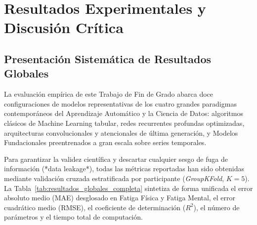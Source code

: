 
\chapter{Resultados Experimentales y Discusión Crítica}
\label{cap:resultados}

\section{Presentación Sistemática de Resultados Globales}
\label{sec:res_globales}

La evaluación empírica de este Trabajo de Fin de Grado abarca doce configuraciones de modelos representativas de los cuatro grandes paradigmas contemporáneos del Aprendizaje Automático y la Ciencia de Datos: algoritmos clásicos de Machine Learning tabular, redes recurrentes profundas optimizadas, arquitecturas convolucionales y atencionales de última generación, y Modelos Fundacionales preentrenados a gran escala sobre series temporales. 

Para garantizar la validez científica y descartar cualquier sesgo de fuga de información (*data leakage*), todas las métricas reportadas han sido obtenidas mediante validación cruzada estratificada por participante (\textit{GroupKFold}, $K=5$). La Tabla~\ref{tab:resultados_globales_completa} sintetiza de forma unificada el error absoluto medio (MAE) desglosado en Fatiga Física y Fatiga Mental, el error cuadrático medio (RMSE), el coeficiente de determinación ($R^2$), el número de parámetros y el tiempo total de computación.

